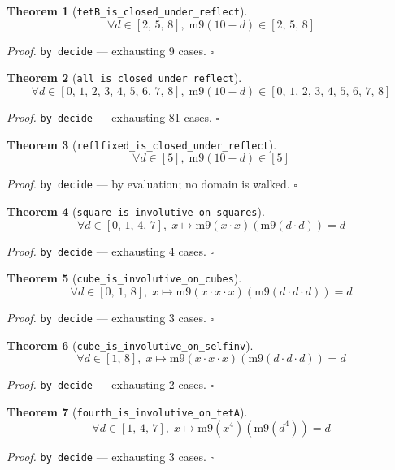 \documentclass[11pt]{article}
\newtheorem{theorem}{Theorem}[section]
\begin{document}
\begin{theorem}[\texttt{tetB\_is\_closed\_under\_reflect}]
\[ \forall d \in [2,\,5,\,8],\; \mathrm{m9}\mathopen{}\left(10 - d\right) \in [2,\,5,\,8] \]
\end{theorem}
\noindent\emph{Proof.} \texttt{by decide} --- exhausting 9 cases. \hfill$\square$

\begin{theorem}[\texttt{all\_is\_closed\_under\_reflect}]
\[ \forall d \in [0,\,1,\,2,\,3,\,4,\,5,\,6,\,7,\,8],\; \mathrm{m9}\mathopen{}\left(10 - d\right) \in [0,\,1,\,2,\,3,\,4,\,5,\,6,\,7,\,8] \]
\end{theorem}
\noindent\emph{Proof.} \texttt{by decide} --- exhausting 81 cases. \hfill$\square$

\begin{theorem}[\texttt{reflfixed\_is\_closed\_under\_reflect}]
\[ \forall d \in [5],\; \mathrm{m9}\mathopen{}\left(10 - d\right) \in [5] \]
\end{theorem}
\noindent\emph{Proof.} \texttt{by decide} --- by evaluation; no domain is walked. \hfill$\square$

\begin{theorem}[\texttt{square\_is\_involutive\_on\_squares}]
\[ \forall d \in [0,\,1,\,4,\,7],\; x \mapsto \mathrm{m9}\mathopen{}\left(x \cdot x\right)\mathopen{}\left(\mathrm{m9}\mathopen{}\left(d \cdot d\right)\right) = d \]
\end{theorem}
\noindent\emph{Proof.} \texttt{by decide} --- exhausting 4 cases. \hfill$\square$

\begin{theorem}[\texttt{cube\_is\_involutive\_on\_cubes}]
\[ \forall d \in [0,\,1,\,8],\; x \mapsto \mathrm{m9}\mathopen{}\left(x \cdot x \cdot x\right)\mathopen{}\left(\mathrm{m9}\mathopen{}\left(d \cdot d \cdot d\right)\right) = d \]
\end{theorem}
\noindent\emph{Proof.} \texttt{by decide} --- exhausting 3 cases. \hfill$\square$

\begin{theorem}[\texttt{cube\_is\_involutive\_on\_selfinv}]
\[ \forall d \in [1,\,8],\; x \mapsto \mathrm{m9}\mathopen{}\left(x \cdot x \cdot x\right)\mathopen{}\left(\mathrm{m9}\mathopen{}\left(d \cdot d \cdot d\right)\right) = d \]
\end{theorem}
\noindent\emph{Proof.} \texttt{by decide} --- exhausting 2 cases. \hfill$\square$

\begin{theorem}[\texttt{fourth\_is\_involutive\_on\_tetA}]
\[ \forall d \in [1,\,4,\,7],\; x \mapsto \mathrm{m9}\mathopen{}\left(x^{4}\right)\mathopen{}\left(\mathrm{m9}\mathopen{}\left(d^{4}\right)\right) = d \]
\end{theorem}
\noindent\emph{Proof.} \texttt{by decide} --- exhausting 3 cases. \hfill$\square$
\end{document}

